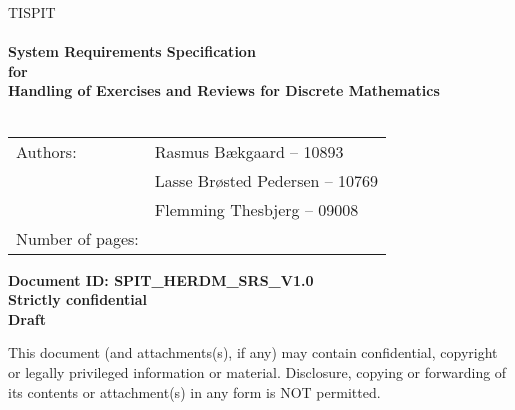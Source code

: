\documentclass[Main]{subfiles}
\begin{document}
\begin{center}

\textsc{\Large TISPIT}\\[0.5cm]


\HRule \\[0.4cm]

{ \huge \bfseries System Requirements Specification}\\[0.4cm]
{ \huge \bfseries for}\\[0.4cm] 
{ \huge \bfseries Handling of Exercises and Reviews for Discrete Mathematics}\\[0.4cm]

\HRule \\[1.5cm]

\begin{tabular}{p{}|p{}}
\hline 
Authors: & Rasmus Bækgaard -- 10893\\ &Lasse Brøsted Pedersen -- 10769\\ &Flemming Thesbjerg -- 09008\\ 
\hline 
Number of pages: & \pageref{LastPage} \\
\hline 
\end{tabular} \vspace{40pt}

\textbf{\Large Document ID: SPIT\_HERDM\_SRS\_V1.0}\\
\textbf{\Large Strictly confidential}\\
\textbf{\Large Draft}

This document (and attachments(s), if any) may contain confidential, copyright or legally privileged information or material.
Disclosure, copying or forwarding of its contents or attachment(s) in any form is NOT permitted.
\end{center}
\end{document}
